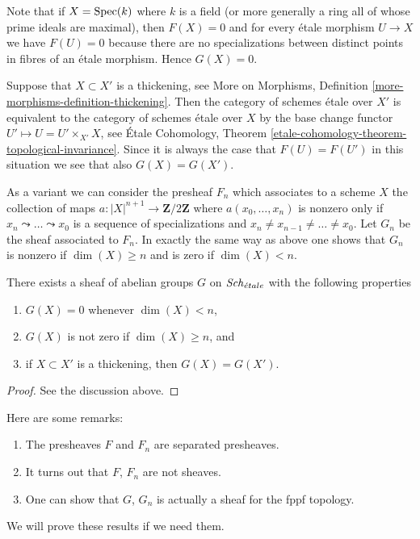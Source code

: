 \medskip\noindent
Note that if $X = \mathop{\mathrm{Spec}}(k)$ where $k$ is a field (or more generally
a ring all of whose prime ideals are maximal), then $F(X) = 0$
and for every \'etale morphism $U \to X$ we have $F(U) = 0$ because there
are no specializations between distinct points in fibres of an \'etale
morphism. Hence $G(X) = 0$.

\medskip\noindent
Suppose that $X \subset X'$ is a thickening, see
More on Morphisms, Definition \ref{more-morphisms-definition-thickening}.
Then the category of schemes \'etale over $X'$ is equivalent to the
category of schemes \'etale over $X$ by the base change functor
$U' \mapsto U = U' \times_{X'} X$, see
\'Etale Cohomology,
Theorem \ref{etale-cohomology-theorem-topological-invariance}.
Since it is always the case that $F(U) = F(U')$ in this situation
we see that also $G(X) = G(X')$.

\medskip\noindent
As a variant we can consider the presheaf $F_n$ which associates
to a scheme $X$ the collection of maps
$a : |X|^{n + 1} \to \mathbf{Z}/2\mathbf{Z}$ where $a(x_0, \ldots, x_n)$
is nonzero only if $x_n \leadsto \ldots \leadsto x_0$ is a sequence of
specializations and $x_n \not = x_{n - 1} \not = \ldots \not = x_0$.
Let $G_n$ be the sheaf associated to $F_n$.
In exactly the same way as above one shows that $G_n$ is nonzero
if $\dim(X) \geq n$ and is zero if $\dim(X) < n$.

\begin{lemma}
\label{lemma-sheaf-zero-on-low-dimension}
There exists a sheaf of abelian groups $G$ on
$\mathit{Sch}_{\acute{e}tale}$ with the following properties
\begin{enumerate}
\item $G(X) = 0$ whenever $\dim(X) < n$,
\item $G(X)$ is not zero if $\dim(X) \geq n$, and
\item if $X \subset X'$ is a thickening, then $G(X) = G(X')$.
\end{enumerate}
\end{lemma}

\begin{proof}
See the discussion above.
\end{proof}

\begin{remark}
\label{remark-specialization}
Here are some remarks:
\begin{enumerate}
\item The presheaves $F$ and $F_n$ are separated presheaves.
\item It turns out that $F$, $F_n$ are not sheaves.
\item One can show that $G$, $G_n$ is actually a sheaf for the fppf topology.
\end{enumerate}
We will prove these results if we need them.
\end{remark}


